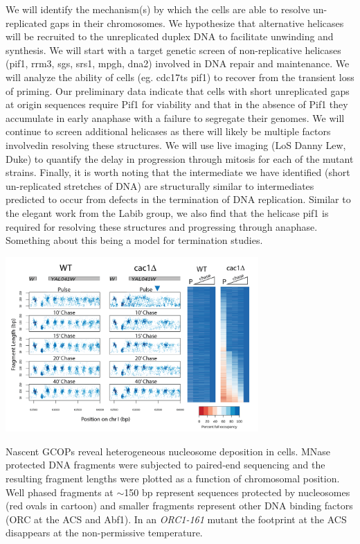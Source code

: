 We will identify the mechanism(s) by which the cells are able to resolve un-replicated gaps in their chromosomes.  We hypothesize that alternative helicases will be recruited to the unreplicated duplex DNA to facilitate unwinding and synthesis.  We will start with a target genetic screen of non-replicative helicases (pif1, rrm3, sgs, srs1, mpgh, dna2) involved in DNA repair and maintenance.  We will analyze the ability of cells (eg. cdc17ts pif1) to recover from the transient loss of priming.  Our preliminary data indicate that cells with short unreplicated gaps at origin sequences require Pif1 for viability and that in the absence of Pif1 they accumulate in early anaphase with a failure to segregate their genomes.  We will continue to screen additional helicases as there will likely be multiple factors involvedin resolving these structures.  We will use live imaging (LoS Danny Lew, Duke) to quantify the delay in progression through mitosis for each of the mutant strains.  Finally, it is worth noting that the intermediate we have identified (short un-replicated stretches of DNA) are structurally similar to intermediates predicted to occur from defects in the termination of DNA replication. Similar to the elegant \invitro work from the Labib group, we also find that the helicase pif1 is required for resolving these structures and progressing through anaphase.  Something about this being a model for termination studies. 
\begin{floatingfigure}[lt]{3.8in}
\vspace{-4mm}
\begin{center}
\includegraphics[width=3.8in]{r35_figures/cac_typhoon_heatmap_dm.png}
\end{center}
\vspace{3mm}
\caption{Nascent GCOPs reveal heterogeneous nucleosome deposition in \cac cells.  MNase protected DNA fragments were subjected to paired-end sequencing and the resulting fragment lengths were plotted as a function of chromosomal position.  Well phased fragments at $\sim$150 bp represent sequences protected by nucleosomes (red ovals in cartoon) and smaller fragments represent other DNA binding factors (\eg ORC at the ACS and Abf1).  In an \textit{ORC1-161} mutant the footprint at the ACS disappears at the non-permissive temperature.}%
\end{floatingfigure}%

